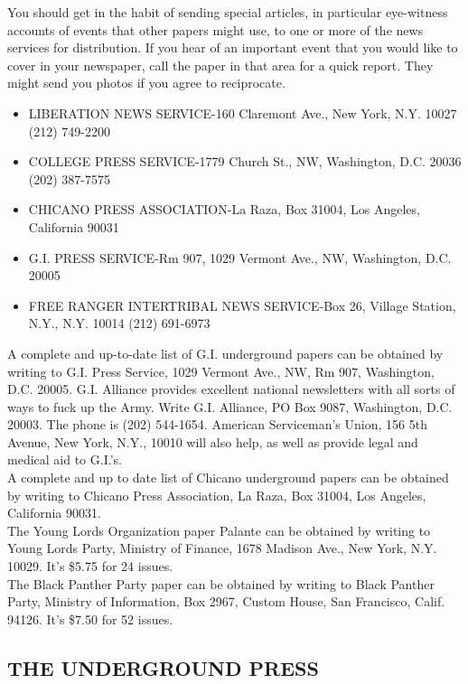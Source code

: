 \documentclass[11pt,twoside,a4paper]{book}
\begin{document}
You should get in the habit of sending special articles, in particular eye-witness accounts of events that other papers might use, to one or more of the news services for distribution. If you hear of an important event that you would like to cover in your newspaper, call the paper in that area for a quick report. They might send you photos if you agree to reciprocate.~\\
\begin{itemize}
	\item LIBERATION NEWS SERVICE-160 Claremont Ave., New York, N.Y. 10027 (212) 749-2200 
	\item COLLEGE PRESS SERVICE-1779 Church St., NW, Washington, D.C. 20036 (202) 387-7575 
	\item CHICANO PRESS ASSOCIATION-La Raza, Box 31004, Los Angeles, California 90031 
	\item G.I. PRESS SERVICE-Rm 907, 1029 Vermont Ave., NW, Washington, D.C. 20005 
	\item FREE RANGER INTERTRIBAL NEWS SERVICE-Box 26, Village Station, N.Y., N.Y. 10014 (212) 	691-6973
\end{itemize}

	A complete and up-to-date list of G.I. underground papers can be obtained by writing to G.I. Press Service, 1029 Vermont Ave., NW, Rm 907, Washington, D.C. 20005. G.I. Alliance provides excellent national newsletters with all sorts of ways to fuck up the Army. Write G.I. Alliance, PO Box 9087, Washington, D.C. 20003. The phone is (202) 544-1654. American Serviceman's Union, 156 5th Avenue, New York, N.Y., 10010 will also help, as well as provide legal and medical aid to G.I.'s.~\\

A complete and up to date list of Chicano underground papers can be obtained by writing to Chicano Press Association, La Raza, Box 31004, Los Angeles, California 90031.~\\

The Young Lords Organization paper Palante can be obtained by writing to Young Lords Party, Ministry of Finance, 1678 Madison Ave., New York, N.Y. 10029. It's \$5.75 for 24 issues.~\\

The Black Panther Party paper can be obtained by writing to Black Panther Party, Ministry of Information, Box 2967, Custom House, San Francisco, Calif. 94126. It's \$7.50 for 52 issues.~\\

\subsection{THE UNDERGROUND PRESS}
\end{document}
